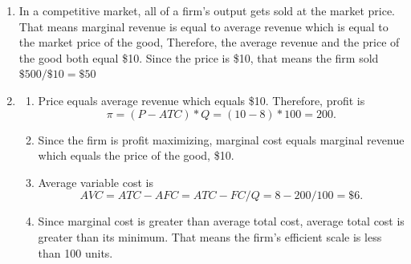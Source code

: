 \documentclass{article}
\begin{document}
\begin{enumerate}
\begin{enumerate}
	\end{enumerate}

\setcounter{enumi}{5}	
\item In a competitive market, all of a firm's output gets sold at the market price. That means marginal revenue is equal to average revenue which is equal to the market price of the good, Therefore, the average revenue and the price of the good both equal \$10. Since the price is \$10, that means the firm sold $\$500 / \$10 = \$50$

\item

	\begin{enumerate}
	
	\item Price equals average revenue which equals \$10. Therefore, profit is \[\pi = (P - ATC)*Q = (10 - 8)*100 = 200.\]
	
	\item Since the firm is profit maximizing, marginal cost equals marginal revenue which equals the price of the good, \$10.
	
	\item Average variable cost is 
	\[ AVC = ATC - AFC = ATC - FC/Q = 8 - 200/100 = \$6.\]
	
	\item Since marginal cost is greater than average total cost, average total cost is greater than its minimum. That means the firm's efficient scale is less than 100 units.
	
	\end{enumerate}

\end{enumerate}
\end{document}
